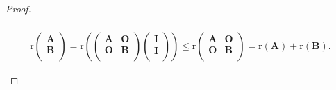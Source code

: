 \documentclass[../../main.tex]{subfiles}
\begin{document}
\begin{proof}
\begin{enumerate}[(1)]
\begin{align*}
\\
\mathrm{r}\left( \begin{array}{c}
\boldsymbol{A}\\
\boldsymbol{B}\\
\end{array} \right) =\mathrm{r}\left( \left( \begin{matrix}
\boldsymbol{A}&		\boldsymbol{O}\\
\boldsymbol{O}&		\boldsymbol{B}\\
\end{matrix} \right) \left( \begin{array}{c}
\boldsymbol{I}\\
\boldsymbol{I}\\
\end{array} \right) \right) \leqslant \mathrm{r}\left( \begin{matrix}
\boldsymbol{A}&		\boldsymbol{O}\\
\boldsymbol{O}&		\boldsymbol{B}\\
\end{matrix} \right) =\mathrm{r}\left( \boldsymbol{A} \right) +\mathrm{r}\left( \boldsymbol{B} \right) .
\end{align*}


\end{enumerate}
\end{proof}
\end{document}
